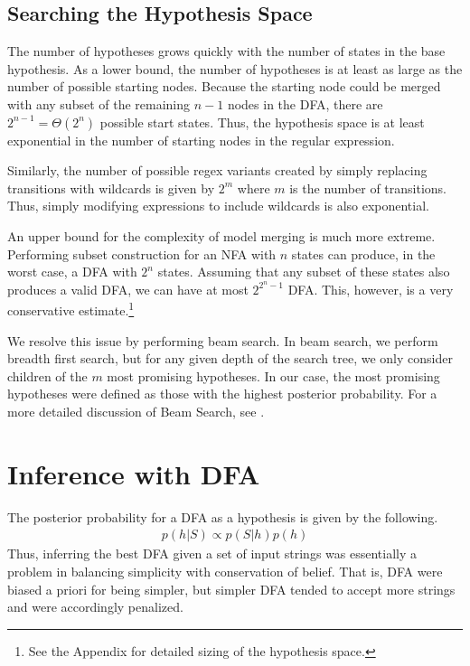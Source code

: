 \documentclass[10pt,letterpaper]{article}
\begin{document}
\subsection{Searching the Hypothesis Space} The number of hypotheses grows quickly with the number of states in the base hypothesis. As a lower bound, the number of hypotheses is at least as large as the number of possible starting nodes. Because the starting node could be merged with any subset of the remaining $n-1$ nodes in the DFA, there are $2^{n-1}=\Theta(2^n)$ possible start states. Thus, the hypothesis space is at least exponential in the number of starting nodes in the regular expression.

Similarly, the number of possible regex variants created by simply replacing transitions with wildcards is given by $2^m$ where $m$ is the number of transitions. Thus, simply modifying expressions to include wildcards is also exponential.

An upper bound for the complexity of model merging is much more extreme. Performing subset construction for an NFA with $n$ states can produce, in the worst case, a DFA with $2^n$ states. Assuming that any subset of these states also produces a valid DFA, we can have at most $2^{2^n-1}$ DFA. This, however, is a very conservative estimate.\footnote{See the Appendix for detailed sizing of the hypothesis space.}

We resolve this issue by performing beam search. In beam search, we perform breadth first search, but for any given depth of the search tree, we only consider children of the $m$ most promising hypotheses. In our case, the most promising hypotheses were defined as those with the highest posterior probability. For a more detailed discussion of Beam Search, see .


\section{Inference with DFA}
The posterior probability for a DFA as a hypothesis is given by the following.
\begin{align*}
	p(h|S) \propto p(S|h)p(h)
\end{align*}
Thus, inferring the best DFA given a set of input strings was essentially a problem in balancing simplicity with conservation of belief. That is, DFA were biased a priori for being simpler, but simpler DFA tended to accept more strings and were accordingly penalized.
\end{document}
